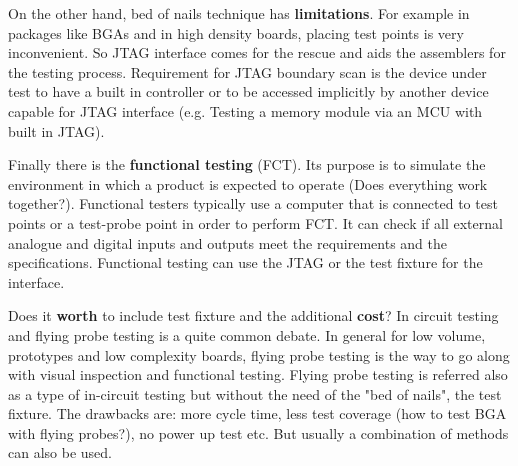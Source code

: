 \documentclass[12pt]{article}
\begin{document}
On the other hand, bed of nails technique has \textbf{limitations}. For example in packages like BGAs and in high density boards, placing test points is very inconvenient. So JTAG interface comes for the rescue and aids the assemblers for the testing process. Requirement for JTAG boundary scan is the device under test to have a built in controller or to be accessed implicitly by another device capable for JTAG interface (e.g. Testing a memory module via an MCU with built in JTAG).





Finally there is the \textbf{functional testing} (FCT). Its purpose is to simulate the environment in which a product is expected to operate (Does everything work together?). Functional testers typically use a computer that is connected to test points or a test-probe point in order to perform FCT.
It can check if all external analogue and digital inputs and outputs meet the requirements and the specifications. Functional testing can use the JTAG or the test fixture for the interface. 



Does it \textbf{worth} to include test fixture and the additional \textbf{cost}? In circuit testing and flying probe testing is a quite common debate. In general for low volume, prototypes and low complexity boards, flying probe testing is the way to go along with visual inspection and functional testing. Flying probe testing is referred also as a type of in-circuit testing but without the need of the "bed of nails", the test fixture. The drawbacks are: more cycle time, less test coverage (how to test BGA with flying probes?), no power up test etc. But usually a combination of methods can also be used. 
\end{document}

